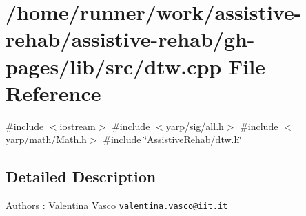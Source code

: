 \section{/home/runner/work/assistive-\/rehab/assistive-\/rehab/gh-\/pages/lib/src/dtw.cpp File Reference}
\label{dtw_8cpp}
{\ttfamily \#include $<$iostream$>$}\newline
{\ttfamily \#include $<$yarp/sig/all.\+h$>$}\newline
{\ttfamily \#include $<$yarp/math/\+Math.\+h$>$}\newline
{\ttfamily \#include \char`\"{}Assistive\+Rehab/dtw.\+h\char`\"{}}\newline


\subsection{Detailed Description}
\begin{DoxyAuthor}{Authors}
\+: Valentina Vasco \href{mailto:valentina.vasco@iit.it}{\tt valentina.\+vasco@iit.\+it} 
\end{DoxyAuthor}
